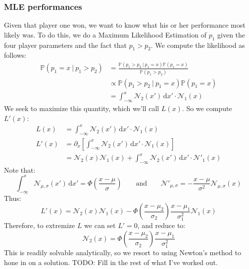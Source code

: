 \documentclass[12pt]{article}
\begin{document}
\subsubsection{MLE performances}
Given that player one won, we want to know what his or her performance most likely was.
To do this, we do a Maximum Likelihood Estimation of $p_1$ given the four player parameters and the fact that $p_1 > p_2$.
We compute the likelihood as follows:
\begin{align*}
\mathbb{P}(p_1 = x\ |\ p_1 > p_2) &= \frac{\mathbb{P}(p_1 > p_2\ |\ p_1 = x) \mathbb{P}(p_1 = x)}{\mathbb{P}(p_1 > p_2)} \\
&\propto \mathbb{P}(p_1 > p_2\ |\ p_1 = x) \mathbb{P}(p_1 = x) \\
&= \int_{-\infty}^x \mathcal{N}_2(x') \, \mathrm{d}x' \cdot \mathcal{N}_1(x)
\end{align*}
We seek to maximize this quantity, which we'll call $L(x)$.
So we compute $L'(x)$:
\begin{align*}
L(x) &= \int_{-\infty}^x \mathcal{N}_2(x') \, \mathrm{d}x' \cdot \mathcal{N}_1(x) \\
L'(x) &= \partial_x \left[ \int_{-\infty}^x \mathcal{N}_2(x') \, \mathrm{d}x' \cdot \mathcal{N}_1(x) \right] \\
&= \mathcal{N}_2(x) \mathcal{N}_1(x) +
\int_{-\infty}^x \mathcal{N}_2(x') \, \mathrm{d}x' \cdot \mathcal{N}'_1(x)
\end{align*}
Note that:
\[
	\int_{-\infty}^x \mathcal{N}_{\mu, \sigma}(x') \, \mathrm{d}x' = \Phi\left(\frac{x - \mu}{\sigma}\right)
	\qquad \text{and} \qquad
	\mathcal{N}'_{\mu,\sigma} = - \frac{x - \mu}{\sigma^2} \mathcal{N}_{\mu, \sigma}(x)
\]
Thus: 
\[
	L'(x) =
	\mathcal{N}_2(x) \mathcal{N}_1(x) -
	\Phi\left(\frac{x - \mu_2}{\sigma_2}\right) \frac{x - \mu_1}{\sigma_1^2} \mathcal{N}_1(x)
\]
Therefore, to extremize $L$ we can set $L' = 0$, and reduce to:
\[ \mathcal{N}_2(x) = \Phi\left(\frac{x - \mu_2}{\sigma_2}\right) \frac{x - \mu_1}{\sigma_1^2} \]
This is readily solvable analytically, so we resort to using Newton's method to hone in on a solution.
TODO: Fill in the rest of what I've worked out.
\end{document}
